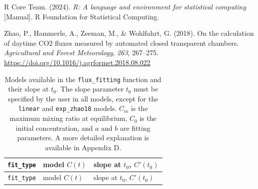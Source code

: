 \documentclass[
  letterpaper,
  DIV=11,
  numbers=noendperiod]{scrartcl}
\newlength{\cslhangindent}
\newenvironment{CSLReferences}[2] %
 {\begin{list}{}{%
  \setlength{\itemindent}{0pt}
  \setlength{\leftmargin}{0pt}
  \setlength{\parsep}{0pt}
  \ifodd #1
   \setlength{\leftmargin}{\cslhangindent}
   \setlength{\itemindent}{-1\cslhangindent}
  \fi
  \setlength{\itemsep}{#2\baselineskip}}}
 {\end{list}}
\begin{document}
\begin{CSLReferences}{1}{0}
R Core Team. (2024). \emph{R: A language and environment for statistical
computing} {[}Manual{]}. R Foundation for Statistical Computing.

Zhao, P., Hammerle, A., Zeeman, M., \& Wohlfahrt, G. (2018). On the
calculation of daytime {CO2} fluxes measured by automated closed
transparent chambers. \emph{Agricultural and Forest Meteorology},
\emph{263}, 267--275.
\url{https://doi.org/10.1016/j.agrformet.2018.08.022}

\end{CSLReferences}

\newpage

\small

\begin{longtable}[]{@{}
  >{\raggedright\arraybackslash}p{}
  >{\raggedright\arraybackslash}p{}
  >{\raggedright\arraybackslash}p{}@{}}
\caption{\normalsize Models available in the \texttt{flux\_fitting}
function and their slope at \(t_0\). The slope parameter \(t_0\) must be
specified by the user in all models, except for the \texttt{linear} and
\texttt{exp\_zhao18} models. \(C_m\) is the maximum mixing ratio at
equilibrium, \(C_0\) is the initial concentration, and \(a\) and \(b\)
are fitting parameters. A more detailed explanation is available in
Appendix D.}\label{tbl-fits}\tabularnewline
\toprule\noalign{}
\begin{minipage}[b]{\linewidth}\raggedright
\texttt{fit\_type}
\end{minipage} & \begin{minipage}[b]{\linewidth}\raggedright
model \(C(t)\)
\end{minipage} & \begin{minipage}[b]{\linewidth}\raggedright
slope at \(t_0\), \(C'(t_0)\)
\end{minipage} \\
\midrule\noalign{}
\endfirsthead
\toprule\noalign{}
\begin{minipage}[b]{\linewidth}\raggedright
\texttt{fit\_type}
\end{minipage} & \begin{minipage}[b]{\linewidth}\raggedright
model \(C(t)\)
\end{minipage} & \begin{minipage}[b]{\linewidth}\raggedright
slope at \(t_0\), \(C'(t_0)\)

\end{minipage}
\end{longtable}
\end{document}
